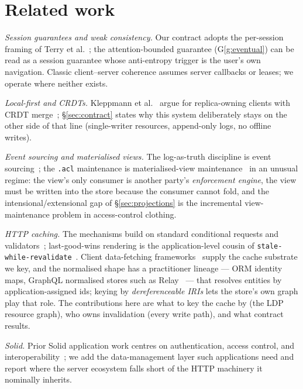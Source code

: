 \documentclass[11pt,a4paper]{article}
\theoremstyle{remark}
\newcommand{\code}[1]{\texttt{#1}}
\begin{document}
\section{Related work}\label{sec:related}

\emph{Session guarantees and weak consistency.} Our contract adopts the
per-session framing of Terry et al.~\cite{terry1994}; the attention-bounded
guarantee (G\ref{g:eventual}) can be read as a session guarantee whose
anti-entropy trigger is the user's own navigation. Classic client--server
coherence assumes server callbacks or leases; we operate where neither exists.

\emph{Local-first and CRDTs.} Kleppmann et al.~\cite{kleppmann2019} argue for
replica-owning clients with CRDT merge~\cite{shapiro2011}; \S\ref{sec:contract}
states why this system deliberately stays on the other side of that line
(single-writer resources, append-only logs, no offline writes).

\emph{Event sourcing and materialised views.} The log-as-truth discipline is
event sourcing~\cite{fowler-es,helland2016}; the \code{.acl} maintenance is
materialised-view maintenance~\cite{gupta1995} in an unusual regime: the view's
only consumer is another party's \emph{enforcement engine}, the view must be
written into the store because the consumer cannot fold, and the
intensional/extensional gap of \S\ref{sec:projections} is the incremental
view-maintenance problem in access-control clothing.

\emph{HTTP caching.} The mechanisms build on standard conditional requests and
validators~\cite{rfc9111}; last-good-wins rendering is the application-level
cousin of \code{stale-while-revalidate}~\cite{rfc5861}. Client data-fetching
frameworks~\cite{reactquery} supply the cache substrate we key, and the
normalised shape has a practitioner lineage --- ORM identity maps, GraphQL
normalised stores such as Relay~\cite{relay} --- that resolves entities by
application-assigned ids; keying by \emph{dereferenceable IRIs} lets the
store's own graph play that role. The contributions here are what to key the
cache by (the LDP resource graph), who owns invalidation (every write path),
and what contract results.

\emph{Solid.} Prior Solid application work centres on authentication, access
control, and interoperability~\cite{solid,wac,solid-notifications}; we add the
data-management layer such applications need and report where the server
ecosystem falls short of the HTTP machinery it nominally inherits.
\end{document}
